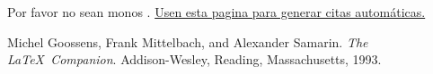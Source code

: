 



	Por favor no sean monos \cite{ref:nomono}. \href{https://www.citethisforme.com/es/ieee}{Usen esta pagina para generar citas automáticas.}


\begin{thebibliography}{9}
Michel Goossens, Frank Mittelbach, and Alexander Samarin. 
\textit{The \LaTeX\ Companion}. 
Addison-Wesley, Reading, Massachusetts, 1993.
\end{thebibliography}

